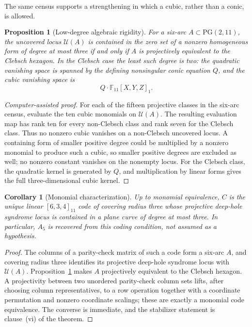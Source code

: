 \documentclass[11pt]{article}
\newtheorem{proposition}[theorem]{Proposition}
\newtheorem{corollary}[theorem]{Corollary}
\theoremstyle{definition}
\theoremstyle{remark}
\newcommand{\PG}{\mathrm{PG}}
\newcommand{\F}{\mathbb{F}}
\newcommand{\cU}{\mathcal{U}}
\begin{document}
The same census supports a strengthening in which a cubic, rather than a
conic, is allowed.

\begin{proposition}[Low-degree algebraic rigidity]
\label{prop:low-degree-rigidity}
For a six-arc $A\subset\PG(2,11)$, the uncovered locus $\cU(A)$ is
contained in the zero set of a nonzero homogeneous form of degree at most
three if and only if $A$ is projectively equivalent to the Clebsch
hexagon. In the Clebsch case the least such degree is two: the quadratic
vanishing space is spanned by the defining nonsingular conic equation $Q$,
and the cubic vanishing space is
\[
 Q\cdot\F_{11}[X,Y,Z]_1.
\]
\end{proposition}

\begin{proof}[Computer-assisted proof]
For each of the fifteen projective classes in the six-arc census, evaluate
the ten cubic monomials on $\cU(A)$. The resulting evaluation map has rank
ten for every non-Clebsch class and rank seven for the Clebsch class. Thus
no nonzero cubic vanishes on a non-Clebsch uncovered locus. A containing
form of smaller positive degree could be multiplied by a nonzero monomial
to produce such a cubic, so smaller positive degrees are excluded as well;
no nonzero constant vanishes on the nonempty locus. For the
Clebsch class, the quadratic kernel is generated by $Q$, and multiplication
by linear forms gives the full three-dimensional cubic kernel.
\end{proof}

\begin{corollary}[Monomial characterization]
Up to monomial equivalence, $C$ is the unique linear $[6,3,4]_{11}$ code of
covering radius three whose projective deep-hole syndrome locus is contained
in a plane curve of degree at most three. In particular, $A_5$ is recovered
from this coding condition, not assumed as a hypothesis.
\end{corollary}

\begin{proof}
The columns of a parity-check matrix of such a code form a six-arc $A$, and
covering radius three identifies its projective deep-hole syndrome locus
with $\cU(A)$. Proposition~\ref{prop:low-degree-rigidity} makes $A$ projectively equivalent
to the Clebsch hexagon. A projectivity between two unordered parity-check
column sets lifts, after choosing column representatives, to a row operation
together with a coordinate permutation and nonzero coordinate scalings;
these are exactly a monomial code equivalence. The converse is immediate,
and the stabilizer statement is clause~(vi) of the theorem.
\end{proof}
\end{document}
